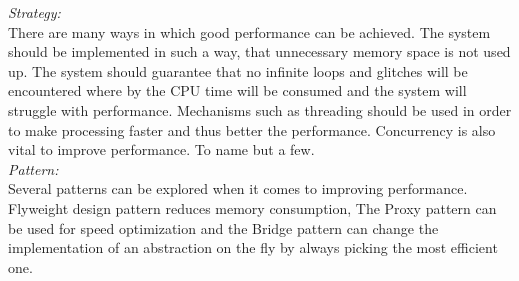\documentclass[a4paper,12pt]{report}
\begin{document}
		\emph{Strategy: }\\ There are many ways in which good performance can be achieved. The system should be implemented in such a way, that unnecessary memory space is not used up. The system should guarantee that no infinite loops and glitches will be encountered where by the CPU time will be consumed and the system will struggle with performance. Mechanisms such as threading should be used in order to make processing faster and thus better the performance. Concurrency is also vital to improve performance. To name but a few. \\
		
		\emph{Pattern: }\\ Several patterns can be explored when it comes to improving performance. Flyweight design pattern reduces memory consumption, The Proxy pattern can be used for speed optimization and the Bridge pattern can change the implementation of an abstraction on the fly by always picking the most efficient one.\\
		
\end{document}
